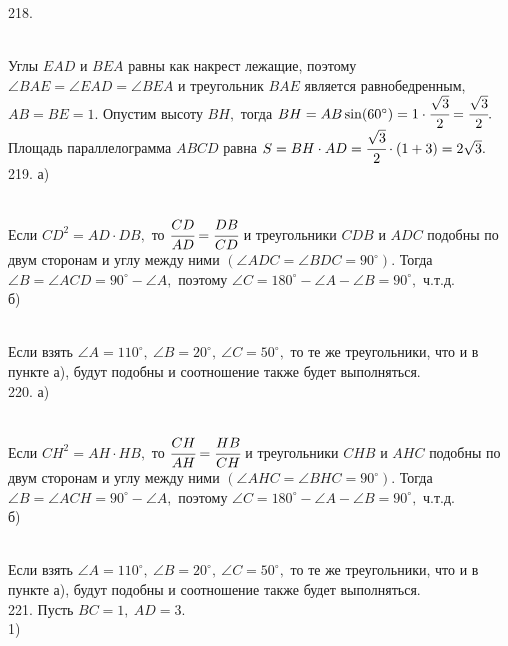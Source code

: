 218. \begin{figure}[ht!]
\end{figure}\\
Углы $EAD$ и $BEA$ равны как накрест лежащие, поэтому $\angle BAE=\angle EAD=\angle BEA$ и треугольник $BAE$ является равнобедренным, $AB=BE=1.$ Опустим высоту $BH,$ тогда $BH=AB\sin(60^\circ)=1\cdot\cfrac{\sqrt{3}}{2}=\cfrac{\sqrt{3}}{2}.$ Площадь параллелограмма $ABCD$ равна $S=BH\cdot AD=\cfrac{\sqrt{3}}{2}\cdot(1+3)=2\sqrt{3}.$\\
219. а)\begin{figure}[ht!]
\end{figure}\\
Если $CD^2=AD\cdot DB,$ то $\cfrac{CD}{AD}=\cfrac{DB}{CD}$ и треугольники $CDB$ и $ADC$ подобны по двум сторонам и углу между ними $(\angle ADC=\angle BDC=90^\circ).$ Тогда $\angle B=\angle ACD=90^\circ-\angle A,$ поэтому $\angle C=180^\circ-\angle A-\angle B=90^\circ,$ ч.т.д.\\
б) \begin{figure}[ht!]
\end{figure}\\
Если взять $\angle A=110^\circ,\ \angle B=20^\circ,\ \angle C=50^\circ,$ то те же треугольники, что и в пункте а), будут подобны и соотношение также будет выполняться.\\
220. а)\begin{figure}[ht!]
\end{figure}\\
Если $CH^2=AH\cdot HB,$ то $\cfrac{CH}{AH}=\cfrac{HB}{CH}$ и треугольники $CHB$ и $AHC$ подобны по двум сторонам и углу между ними $(\angle AHC=\angle BHC=90^\circ).$ Тогда $\angle B=\angle ACH=90^\circ-\angle A,$ поэтому $\angle C=180^\circ-\angle A-\angle B=90^\circ,$ ч.т.д.\\
б) \begin{figure}[ht!]
\end{figure}\\
Если взять $\angle A=110^\circ,\ \angle B=20^\circ,\ \angle C=50^\circ,$ то те же треугольники, что и в пункте а), будут подобны и соотношение также будет выполняться.\\
221. Пусть $BC=1,\ AD=3.$\\
1) \begin{figure}[ht!]
\end{figure}\\
